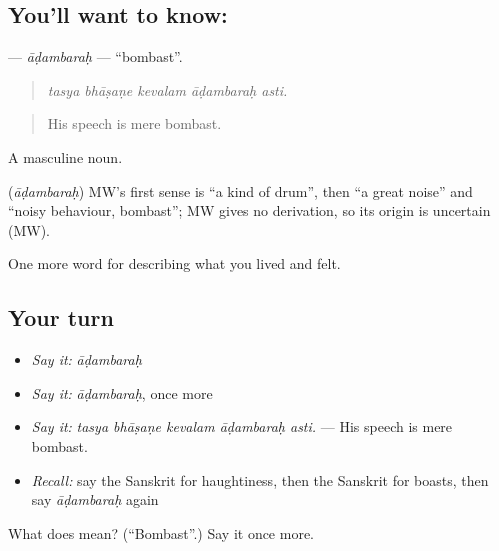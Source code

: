 \subsection*{You'll want to know: }
\textbf{} — \emph{āḍambaraḥ} — \textquotedblleft{}bombast\textquotedblright{}.

\begin{quote}
    
\end{quote}

\begin{quote}
\emph{tasya bhāṣaṇe kevalam āḍambaraḥ asti.}
\end{quote}

\begin{quote}
His speech is mere bombast.
\end{quote}

A masculine noun.

\begin{cousinweb}
\textbf{} (\emph{āḍambaraḥ}) MW's first sense is \textquotedblleft{}a kind of drum\textquotedblright{}, then \textquotedblleft{}a great noise\textquotedblright{} and \textquotedblleft{}noisy behaviour, bombast\textquotedblright{}; MW gives no derivation, so its origin is uncertain (MW).
\end{cousinweb}

\begin{grammarlens}[title={What you've built}]
One more word for describing what you lived and felt.
\end{grammarlens}

\subsection*{Your turn}
\begin{itemize}
\raggedright
  \item \emph{Say it:} \emph{āḍambaraḥ}
  \item \emph{Say it:} \emph{āḍambaraḥ}, once more
  \item \emph{Say it:} \emph{tasya bhāṣaṇe kevalam āḍambaraḥ asti.} — His speech is mere bombast.
  \item \emph{Recall:} say the Sanskrit for haughtiness, then the Sanskrit for boasts, then say \emph{āḍambaraḥ} again
\end{itemize}

\begin{tcolorbox}[breakable,colback=teal!4,colframe=teal!35!black,title={Before you move on}]
What does  mean? (\textquotedblleft{}Bombast\textquotedblright{}.) Say it once more.
\end{tcolorbox}
